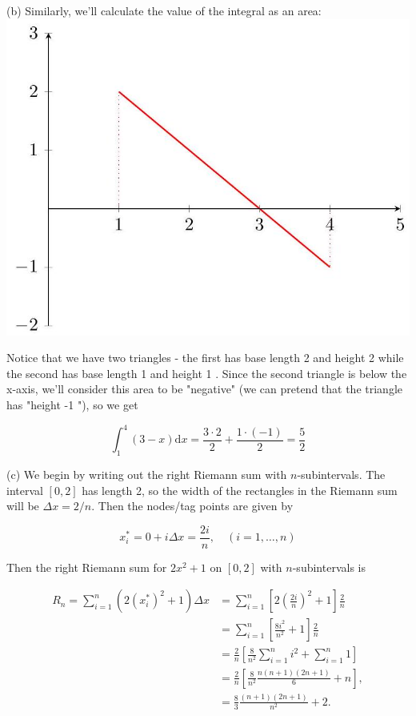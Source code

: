 \documentclass[10pt]{article}
\begin{document}
(b) Similarly, we'll calculate the value of the integral as an area:\\
\includegraphics[max width=\textwidth, center]{2024_12_27_c77fac7b45ac922a81d8g-05}

Notice that we have two triangles - the first has base length 2 and height 2 while the second has base length 1 and height 1 . Since the second triangle is below the x-axis, we'll consider this area to be "negative" (we can pretend that the triangle has "height -1 "), so we get

$$
\int_{1}^{4}(3-x) \mathrm{d} x=\frac{3 \cdot 2}{2}+\frac{1 \cdot(-1)}{2}=\frac{5}{2}
$$

(c) We begin by writing out the right Riemann sum with $n$-subintervals. The interval $[0,2]$ has length 2, so the width of the rectangles in the Riemann sum will be $\Delta x=2 / n$. Then the nodes/tag points are given by

$$
x_{i}^{*}=0+i \Delta x=\frac{2 i}{n}, \quad(i=1, \ldots, n)
$$

Then the right Riemann sum for $2 x^{2}+1$ on $[0,2]$ with $n$-subintervals is

$$
\begin{aligned}
R_{n}=\sum_{i=1}^{n}\left(2\left(x_{i}^{*}\right)^{2}+1\right) \Delta x & =\sum_{i=1}^{n}\left[2\left(\frac{2 i}{n}\right)^{2}+1\right] \frac{2}{n} \\
& =\sum_{i=1}^{n}\left[\frac{8 i^{2}}{n^{2}}+1\right] \frac{2}{n} \\
& =\frac{2}{n}\left[\frac{8}{n^{2}} \sum_{i=1}^{n} i^{2}+\sum_{i=1}^{n} 1\right] \\
& =\frac{2}{n}\left[\frac{8}{n^{2}} \frac{n(n+1)(2 n+1)}{6}+n\right], \\
& =\frac{8}{3} \frac{(n+1)(2 n+1)}{n^{2}}+2 .
\end{aligned}
$$
\end{document}
